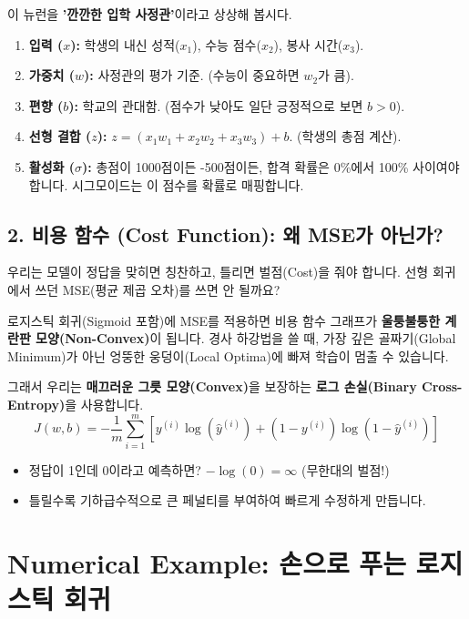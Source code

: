 \documentclass[11pt,a4paper]{book}
\theoremstyle{definition}
\begin{document}
\begin{analogybox}[title={대학 입학 사정관 비유}]
이 뉴런을 \textbf{'깐깐한 입학 사정관'}이라고 상상해 봅시다.
\begin{enumerate}
    \item \textbf{입력 ($x$):} 학생의 내신 성적($x_1$), 수능 점수($x_2$), 봉사 시간($x_3$).
    \item \textbf{가중치 ($w$):} 사정관의 평가 기준. (수능이 중요하면 $w_2$가 큼).
    \item \textbf{편향 ($b$):} 학교의 관대함. (점수가 낮아도 일단 긍정적으로 보면 $b > 0$).
    \item \textbf{선형 결합 ($z$):} $z = (x_1 w_1 + x_2 w_2 + x_3 w_3) + b$. (학생의 총점 계산).
    \item \textbf{활성화 ($\sigma$):} 총점이 1000점이든 -500점이든, 합격 확률은 0\%에서 100\% 사이여야 합니다. 시그모이드는 이 점수를 확률로 매핑합니다.
\end{enumerate}
\end{analogybox}

\subsection{2. 비용 함수 (Cost Function): 왜 MSE가 아닌가?}
우리는 모델이 정답을 맞히면 칭찬하고, 틀리면 벌점(Cost)을 줘야 합니다. 선형 회귀에서 쓰던 MSE(평균 제곱 오차)를 쓰면 안 될까요?

\begin{warningbox}[title={MSE 사용 금지 경보}]
로지스틱 회귀(Sigmoid 포함)에 MSE를 적용하면 비용 함수 그래프가 \textbf{울퉁불퉁한 계란판 모양(Non-Convex)}이 됩니다. 경사 하강법을 쓸 때, 가장 깊은 골짜기(Global Minimum)가 아닌 엉뚱한 웅덩이(Local Optima)에 빠져 학습이 멈출 수 있습니다.
\end{warningbox}

그래서 우리는 \textbf{매끄러운 그릇 모양(Convex)}을 보장하는 \textbf{로그 손실(Binary Cross-Entropy)}을 사용합니다.
$$ J(w, b) = -\frac{1}{m} \sum_{i=1}^{m} [y^{(i)} \log(\hat{y}^{(i)}) + (1-y^{(i)}) \log(1-\hat{y}^{(i)})] $$
\begin{itemize}
    \item 정답이 1인데 0이라고 예측하면? $-\log(0) = \infty$ (무한대의 벌점!)
    \item 틀릴수록 기하급수적으로 큰 페널티를 부여하여 빠르게 수정하게 만듭니다.
\end{itemize}

\section{Numerical Example: 손으로 푸는 로지스틱 회귀}
\end{document}

